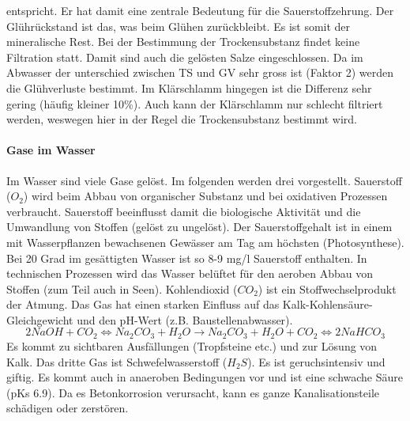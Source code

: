 \documentclass[9pt, openright=false]{scrartcl}
\begin{document}
entspricht. Er hat damit eine zentrale Bedeutung für die Sauerstoffzehrung. Der Glührückstand ist das, was beim Glühen zurückbleibt. Es ist somit der mineralische Rest. Bei der Bestimmung der Trockensubstanz findet keine Filtration statt. Damit sind auch die gelösten Salze eingeschlossen. Da im Abwasser der unterschied zwischen TS und GV sehr gross ist (Faktor 2) werden die Glühverluste bestimmt. Im Klärschlamm hingegen ist die Differenz sehr gering (häufig kleiner 10\%). Auch kann der Klärschlamm nur schlecht filtriert werden, weswegen hier in der Regel die Trockensubstanz bestimmt wird.
\paragraph{Gase im Wasser} Im Wasser sind viele Gase gelöst. Im folgenden werden drei vorgestellt. Sauerstoff ($O_2$) wird beim Abbau von organischer Substanz und bei oxidativen Prozessen verbraucht. Sauerstoff beeinflusst damit die biologische Aktivität und die Umwandlung von Stoffen (gelöst zu ungelöst). Der Sauerstoffgehalt ist in einem mit Wasserpflanzen bewachsenen Gewässer am Tag am höchsten (Photosynthese). Bei 20 Grad im gesättigten Wasser ist so 8-9 mg/l Sauerstoff enthalten. In technischen Prozessen wird das Wasser belüftet für den aeroben Abbau von Stoffen (zum Teil auch in Seen). Kohlendioxid ($CO_2$) ist ein Stoffwechselprodukt der Atmung. Das Gas hat einen starken Einfluss auf das Kalk-Kohlensäure-Gleichgewicht und den pH-Wert (z.B. Baustellenabwasser).\[2 NaOH + CO_2 \Leftrightarrow Na_2CO_3 + H_2O \rightarrow Na_2CO_3 + H_2O + CO_2 \Leftrightarrow 2 NaHCO_3 \] Es kommt zu sichtbaren Ausfällungen (Tropfsteine etc.) und zur Lösung von Kalk. Das dritte Gas ist Schwefelwasserstoff ($H_2S$). Es ist geruchsintensiv und giftig. Es kommt auch in anaeroben Bedingungen vor und ist eine schwache Säure (pKs 6.9). Da es Betonkorrosion verursacht, kann es ganze Kanalisationsteile schädigen oder zerstören.
\end{document}
